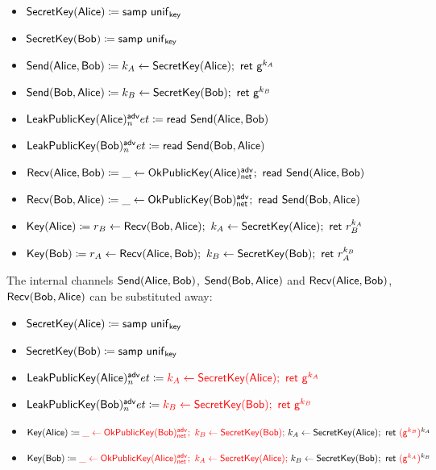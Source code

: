 \begin{itemize}
\item $\mathsf{SecretKey}(\mathsf{Alice}) \coloneqq \mathsf{samp} \ \mathsf{unif}_{\mathsf{key}}$
\item $\mathsf{SecretKey}(\mathsf{Bob}) \coloneqq \mathsf{samp} \ \mathsf{unif}_{\mathsf{key}}$
\item $\mathsf{Send}(\mathsf{Alice},\mathsf{Bob}) \coloneqq k_A \leftarrow \mathsf{SecretKey}(\mathsf{Alice}); \ \mathsf{ret} \ \mathsf{g}^{k_A}$
\item $\mathsf{Send}(\mathsf{Bob},\mathsf{Alice}) \coloneqq k_B \leftarrow \mathsf{SecretKey}(\mathsf{Bob}); \ \mathsf{ret} \ \mathsf{g}^{k_B}$
\item $\mathsf{LeakPublicKey}(\mathsf{Alice})^{\mathsf{adv}}_net \coloneqq \mathsf{read} \ \mathsf{Send}(\mathsf{Alice},\mathsf{Bob})$
\item $\mathsf{LeakPublicKey}(\mathsf{Bob})^{\mathsf{adv}}_net \coloneqq \mathsf{read} \ \mathsf{Send}(\mathsf{Bob},\mathsf{Alice})$
\item $\Recv(\Alice,\Bob) \coloneqq \_ \leftarrow \OkPublicKey(\Alice)^\adv_\net; \ \read{\Send(\Alice,\Bob)}$
\item $\Recv(\Bob,\Alice) \coloneqq \_ \leftarrow \OkPublicKey(\Bob)^\adv_\net; \ \read{\Send(\Bob,\Alice)}$
\item $\Key(\Alice) \coloneqq r_B \leftarrow \Recv(\Bob,\Alice); \ k_A \leftarrow \SecretKey(\Alice); \ \ret{r_B^{k_A}}$
\item $\Key(\Bob) \coloneqq r_A \leftarrow \Recv(\Alice,\Bob); \ k_B \leftarrow \SecretKey(\Bob); \ \ret{r_A^{k_B}}$
\end{itemize}

\noindent The internal channels $\mathsf{Send}(\mathsf{Alice},\mathsf{Bob})$, $\mathsf{Send}(\mathsf{Bob},\mathsf{Alice})$ and $\mathsf{Recv}(\mathsf{Alice},\mathsf{Bob})$, $\mathsf{Recv}(\mathsf{Bob},\mathsf{Alice})$ can be substituted away:

\begin{itemize}
\item $\mathsf{SecretKey}(\mathsf{Alice}) \coloneqq \mathsf{samp} \ \mathsf{unif}_{\mathsf{key}}$
\item $\mathsf{SecretKey}(\mathsf{Bob}) \coloneqq \mathsf{samp} \ \mathsf{unif}_{\mathsf{key}}$
\item $\LeakPublicKey(\Alice)^\adv_net \coloneqq {\color{red} k_A \leftarrow \SecretKey(\Alice); \ \ret{\gen^{k_A}}}$
\item $\LeakPublicKey(\Bob)^\adv_net \coloneqq {\color{red} k_B \leftarrow \SecretKey(\Bob); \ \ret{\gen^{k_B}}}$
\item $\Key(\Alice) \coloneqq {\color{red} \_ \leftarrow \OkPublicKey(\Bob)^\adv_\net; \ k_B \leftarrow \SecretKey(\Bob); \ } k_A \leftarrow \SecretKey(\Alice); \ \ret{{\color{red} (\gen^{k_B})}^{k_A}}$
\item $\Key(\Bob) \coloneqq {\color{red} \_ \leftarrow \OkPublicKey(\Alice)^\adv_\net; \ k_A \leftarrow \SecretKey(\Alice); \ } k_B \leftarrow \SecretKey(\Bob); \ \ret{{\color{red} (\gen^{k_A})}^{k_B}}$
\end{itemize}

